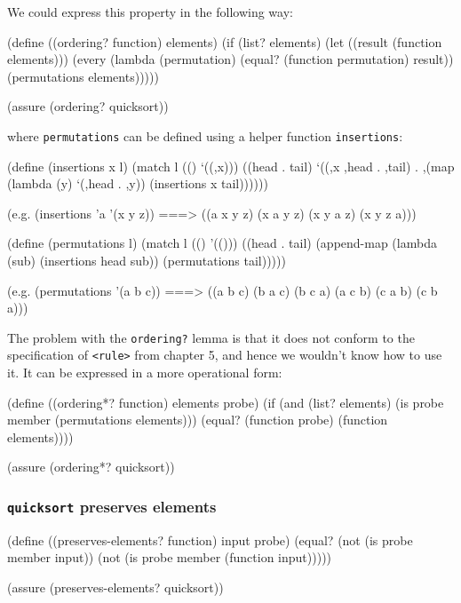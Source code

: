We could express this property in the following way:

\begin{Snippet}
(define ((ordering? function) elements)
  (if (list? elements)
    (let ((result (function elements)))
      (every (lambda (permutation)
               (equal? (function permutation) result))
             (permutations elements)))))

(assure (ordering? quicksort))
\end{Snippet}

where \texttt{permutations} can be defined using a helper function
\texttt{insertions}:

\begin{Snippet}
(define (insertions x l)
  (match l
    (()
     `((,x)))
    ((head . tail)
     `((,x ,head . ,tail) . ,(map (lambda (y)
				    `(,head . ,y))
				  (insertions x tail))))))
\end{Snippet}
\begin{Snippet}
(e.g. (insertions 'a '(x y z))
   ===> ((a x y z) (x a y z) (x y a z) (x y z a)))
\end{Snippet}
\begin{Snippet}
(define (permutations l)
  (match l
    (()
     '(()))
    ((head . tail)
     (append-map (lambda (sub)
		   (insertions head sub))
		 (permutations tail)))))
\end{Snippet}
\begin{Snippet}
(e.g. (permutations '(a b c))
   ===> ((a b c) (b a c) (b c a) (a c b) (c a b) (c b a)))
\end{Snippet}

The problem with the \texttt{ordering?} lemma is that it does not
conform to the specification of \texttt{<rule>} from chapter 5, and hence
we wouldn't know how to use it. It can be expressed in a more operational form:

\begin{Snippet}
(define ((ordering*? function) elements probe)
  (if (and (list? elements)
           (is probe member (permutations elements)))
      (equal? (function probe) (function elements))))

(assure (ordering*? quicksort))
\end{Snippet}

\subsubsection{\texttt{quicksort} preserves elements}

\begin{Snippet}
(define ((preserves-elements? function) input probe)
  (equal? (not (is probe member input))
          (not (is probe member (function input)))))

(assure (preserves-elements? quicksort))
\end{Snippet}

